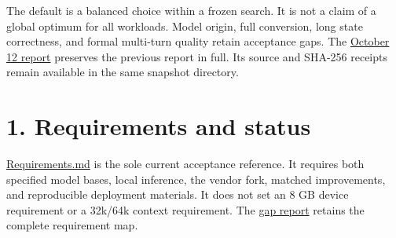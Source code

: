 \documentclass[10pt,a4paper]{article}
\begin{document}
The default is a balanced choice within a frozen search. It is not a
claim of a global optimum for all workloads. Model origin, full
conversion, long state correctness, and formal multi-turn quality retain
acceptance gaps. The
\href{https://github.com/MoyaMryia/riscv-accl/blob/main/spacemit/reports/snapshots/2026-10-12/SUBMISSION-REPORT.pdf}{October
12 report} preserves the previous report in full. Its source and SHA-256
receipts remain available in the same snapshot directory.

\hypertarget{requirements-and-status}{%
\section{1. Requirements and status}\label{requirements-and-status}}

\href{https://github.com/MoyaMryia/riscv-accl/blob/main/Requirements.md}{Requirements.md}
is the sole current acceptance reference. It requires both specified
model bases, local inference, the vendor fork, matched improvements, and
reproducible deployment materials. It does not set an 8 GB device
requirement or a 32k/64k context requirement. The
\href{https://github.com/MoyaMryia/riscv-accl/blob/main/spacemit/reports/2026-10-13-requirements-gap.md}{gap
report} retains the complete requirement map.
\end{document}
